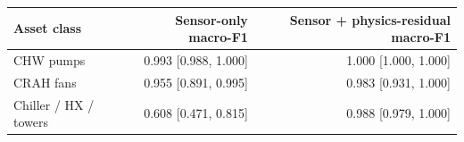 \begin{tabular}{lrr}
\toprule
Asset class & Sensor-only macro-F1 & Sensor + physics-residual macro-F1\\
\midrule
CHW pumps & 0.993 {\scriptsize[0.988, 1.000]} & 1.000 {\scriptsize[1.000, 1.000]}\\
CRAH fans & 0.955 {\scriptsize[0.891, 0.995]} & 0.983 {\scriptsize[0.931, 1.000]}\\
Chiller / HX / towers & 0.608 {\scriptsize[0.471, 0.815]} & 0.988 {\scriptsize[0.979, 1.000]}\\
\bottomrule
\end{tabular}
